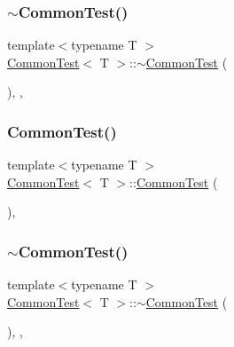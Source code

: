 \mbox{\label{class_common_test_af98e7c54aa3fbfb8e8b9fdbc040ec6b5}} 
\subsubsection{\texorpdfstring{$\sim$CommonTest()}{~CommonTest()}\hspace{0.1cm}{\footnotesize\ttfamily [1/3]}}
{\footnotesize\ttfamily template$<$typename T $>$ \\
\mbox{\hyperlink{class_common_test}{Common\+Test}}$<$ T $>$\+::$\sim$\mbox{\hyperlink{class_common_test}{Common\+Test}} (\begin{DoxyParamCaption}{ }\end{DoxyParamCaption})\hspace{0.3cm}{\ttfamily [inline]}, {\ttfamily [override]}, {\ttfamily [protected]}}

\mbox{\label{class_common_test_abd5ec205d90f4b81efab2a6f972f3db0}} 
\subsubsection{\texorpdfstring{CommonTest()}{CommonTest()}\hspace{0.1cm}{\footnotesize\ttfamily [2/3]}}
{\footnotesize\ttfamily template$<$typename T $>$ \\
\mbox{\hyperlink{class_common_test}{Common\+Test}}$<$ T $>$\+::\mbox{\hyperlink{class_common_test}{Common\+Test}} (\begin{DoxyParamCaption}{ }\end{DoxyParamCaption})\hspace{0.3cm}{\ttfamily [inline]}, {\ttfamily [protected]}}

\mbox{\label{class_common_test_af98e7c54aa3fbfb8e8b9fdbc040ec6b5}} 
\subsubsection{\texorpdfstring{$\sim$CommonTest()}{~CommonTest()}\hspace{0.1cm}{\footnotesize\ttfamily [2/3]}}
{\footnotesize\ttfamily template$<$typename T $>$ \\
\mbox{\hyperlink{class_common_test}{Common\+Test}}$<$ T $>$\+::$\sim$\mbox{\hyperlink{class_common_test}{Common\+Test}} (\begin{DoxyParamCaption}{ }\end{DoxyParamCaption})\hspace{0.3cm}{\ttfamily [inline]}, {\ttfamily [override]}, {\ttfamily [protected]}}

